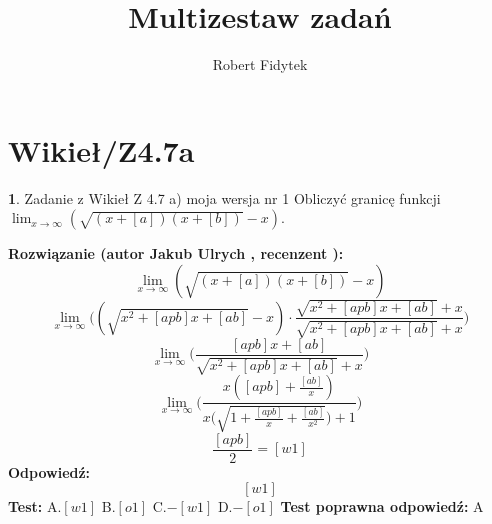 \documentclass[12pt, a4paper]{article}
\title{Multizestaw zadań}
\author{Robert Fidytek}
\date{}
\theoremstyle{definition} %
\newtheorem{zad}{}
\newcommand{\kategoria}[1]{\section{#1}} %
\newcommand{\zadStart}[1]{\begin{zad}#1\newline} %
\newcommand{\zadStop}{\end{zad}}   %
\newcommand{\rozwStart}[2]{\noindent \textbf{Rozwiązanie (autor #1 , recenzent #2): }\newline} %
\newcommand{\rozwStop}{\newline}                                            %
\newcommand{\odpStart}{\noindent \textbf{Odpowiedź:}\newline}    %
\newcommand{\odpStop}{\newline}                                             %
\newcommand{\testStart}{\noindent \textbf{Test:}\newline} %
\newcommand{\testStop}{\newline} %
\newcommand{\kluczStart}{\noindent \textbf{Test poprawna odpowiedź:}\newline} %
\newcommand{\kluczStop}{\newline} %
\begin{document}
\maketitle


\kategoria{Wikieł/Z4.7a}
\zadStart{Zadanie z Wikieł Z 4.7 a) moja wersja nr 1}
Obliczyć granicę funkcji $\lim_{x \to \infty}(\sqrt{(x+[a])(x+[b])}-x)$.
\zadStop
\rozwStart{Jakub Ulrych}{}
$$\lim_{x \to \infty}(\sqrt{(x+[a])(x+[b])}-x)$$
$$\lim_{x \to \infty}\bigg((\sqrt{x^{2}+[apb]x+[ab]}-x)\cdot \frac{\sqrt{x^{2}+[apb]x+[ab]}+x}{\sqrt{x^{2}+[apb]x+[ab]}+x}\bigg)$$
$$\lim_{x \to \infty}\bigg(\frac{[apb]x+[ab]}{\sqrt{x^{2}+[apb]x+[ab]}+x}\bigg)$$
$$\lim_{x \to \infty}\bigg(\frac{x([apb]+\frac{[ab]}{x})}{x\big(\sqrt{1+\frac{[apb]}{x}+\frac{[ab]}{x^{2}}}\big)+1}\bigg)$$
$$\frac{[apb]}{2}=[w1]$$
\rozwStop
\odpStart
$$[w1]$$
\odpStop
\testStart
A.$[w1]$
B.$[o1]$
C.$-[w1]$
D.$-[o1]$
\testStop
\kluczStart
A
\kluczStop
\end{document}
